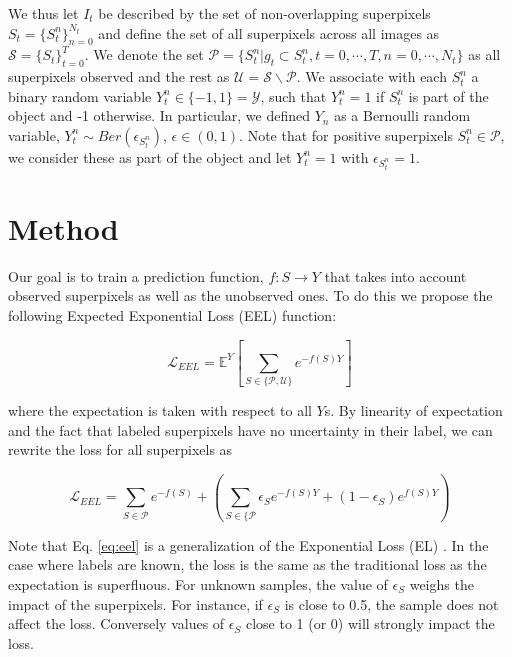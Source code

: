 We thus let $I_t$ be described by the set of non-overlapping superpixels
$S_{t} = \{S^{n}_t\}^{N_t}_{n=0}$ and define the set of all superpixels across all
images as $\mathcal{S} = \{S_t \}^{T}_{t=0}$.
We denote the set $\mathcal{P} = \{S^{n}_t | g_{t} \subset S^{n}_t, t = 0, \cdots, T, n = 0, \cdots, N_t \}$ as all
superpixels observed and the rest as $\mathcal{U} = \mathcal{S} \backslash \mathcal{P}$.
We associate with each $S^{n}_t$ a binary random variable $Y^{n}_{t} \in \{-1, 1\} = \mathcal{Y}$,
such that $Y^{n}_t = 1$ if $S^{n}_t$ is part of the object and -1 otherwise.
In particular, we defined $Y_n$ as a Bernoulli random variable, $Y^{n}_t \sim Ber(\epsilon_{S^{n}_{t}})$, $\epsilon \in (0,1)$.
Note that for positive superpixels $S^{n}_t \in \mathcal{P}$, we consider these as part of the object and let $Y^{n}_t = 1$ with $\epsilon_{S^{n}_{t}}=1$.

\section{Method}
Our goal is to train a prediction function, $f : S \rightarrow Y$
that takes into account observed superpixels as well as the unobserved ones.
To do this we propose the following Expected Exponential Loss (EEL) function:

\begin{equation}
  \mathcal{L}_{EEL} = \mathbb{E}^{Y} \left[ \sum_{S \in \{ \mathcal{P}, \mathcal{U}\}} e^{-f(S)Y}\right]
\end{equation}

where the expectation is taken with respect to all $Y$s.
By linearity of expectation and the fact that labeled superpixels have no uncertainty in their label, we can rewrite the loss for all superpixels as

\begin{equation}
  \label{eq:eel}
  \mathcal{L}_{EEL} = \sum_{S \in \mathcal{P}} e^{-f(S)} + \left( \sum_{S \in \{ \mathcal{P}} \epsilon_{S} e^{-f(S)Y} + (1-\epsilon_{S}) e^{f(S)Y}\right)
\end{equation}

Note that Eq. \ref{eq:eel} is a generalization of the Exponential Loss (EL) \cite{hastie09}.
In the case where labels are known, the loss is the same as the traditional loss as the expectation is superfluous.
For unknown samples, the value of $\epsilon_{S}$ weighs the impact of the superpixels.
For instance, if $\epsilon_{S}$ is close to 0.5, the sample does not affect the loss.
Conversely values of $\epsilon_{S}$ close to 1 (or 0) will strongly impact the loss.

